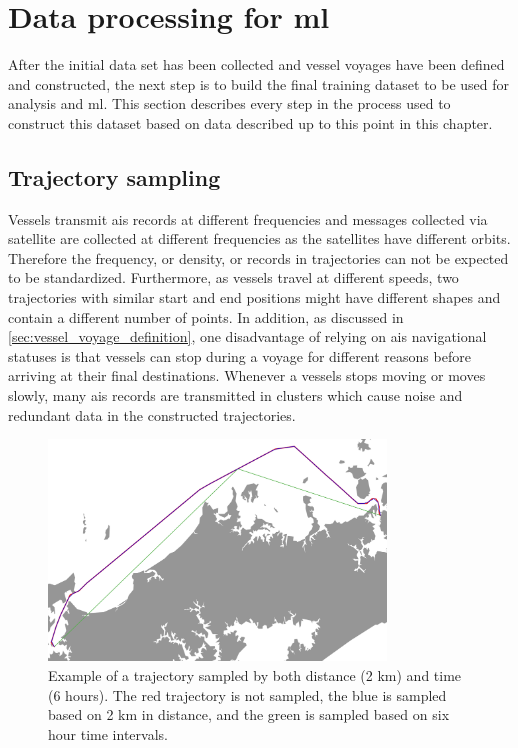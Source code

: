 \section{Data processing for \acrfull{ml}}

After the initial data set has been collected and vessel voyages have been defined and constructed, the next step is to build the final training dataset to be used for analysis and \acrfull{ml}. This section describes every step in the process used to construct this dataset based on data described up to this point in this chapter.

\subsection{Trajectory sampling}

Vessels transmit \acrshort{ais} records at different frequencies and messages collected via satellite are collected at different frequencies as the satellites have different orbits. Therefore the frequency, or density, or records in trajectories can not be expected to be standardized. Furthermore, as vessels travel at different speeds, two trajectories with similar start and end positions might have different shapes and contain a different number of points. In addition, as discussed in \cref{sec:vessel_voyage_definition}, one disadvantage of relying on \acrshort{ais} navigational statuses is that vessels can stop during a voyage for different reasons before arriving at their final destinations. Whenever a vessels stops moving or moves slowly, many \acrshort{ais} records are transmitted in clusters which cause noise and redundant data in the constructed trajectories.

\begin{figure}[htbp]  %
    \centering
    \includegraphics[width=0.8\textwidth]{figures/trajectory_sampling}
    \caption{Example of a trajectory sampled by both distance (2 km) and time (6 hours). The red trajectory is not sampled, the blue is sampled based on 2 km in distance, and the green is sampled based on six hour time intervals.}
    \label{fig:trajectory_sampling}
\end{figure}

